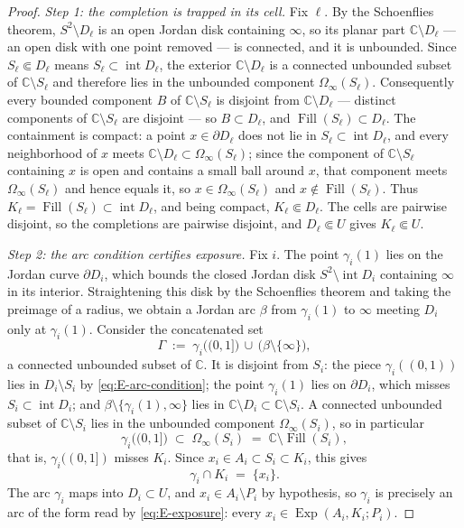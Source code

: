 \documentclass[11pt,reqno]{amsart}
\theoremstyle{definition}
\theoremstyle{remark}
\newcommand{\C}{\mathbb C}
\newcommand{\Fill}{\operatorname{Fill}}
\newcommand{\Exp}{\operatorname{Exp}}
\newcommand{\Int}{\operatorname{int}}
\begin{document}
\begin{proof}
\emph{Step 1: the completion is trapped in its cell.}
Fix $\ell$. By the Schoenflies theorem, $S^2\setminus D_\ell$ is an open Jordan disk
containing $\infty$, so its planar part $\C\setminus D_\ell$ --- an open disk with
one point removed --- is connected, and it is unbounded. Since
$S_\ell\Subset D_\ell$ means $S_\ell\subset\Int D_\ell$, the exterior
$\C\setminus D_\ell$ is a connected unbounded subset of $\C\setminus S_\ell$ and
therefore lies in the unbounded component $\Omega_\infty(S_\ell)$. Consequently
every bounded component $B$ of $\C\setminus S_\ell$ is disjoint from
$\C\setminus D_\ell$ --- distinct components of $\C\setminus S_\ell$ are disjoint
--- so $B\subset D_\ell$, and $\Fill(S_\ell)\subset D_\ell$. The containment is
compact: a point $x\in\partial D_\ell$ does not lie in $S_\ell\subset\Int D_\ell$,
and every neighborhood of $x$ meets $\C\setminus D_\ell\subset
\Omega_\infty(S_\ell)$; since the component of $\C\setminus S_\ell$ containing $x$
is open and contains a small ball around $x$, that component meets
$\Omega_\infty(S_\ell)$ and hence equals it, so $x\in\Omega_\infty(S_\ell)$ and
$x\notin\Fill(S_\ell)$. Thus $K_\ell=\Fill(S_\ell)\subset\Int D_\ell$, and being
compact, $K_\ell\Subset D_\ell$. The cells are pairwise disjoint, so the completions
are pairwise disjoint, and $D_\ell\Subset U$ gives $K_\ell\Subset U$.

\emph{Step 2: the arc condition certifies exposure.}
Fix $i$. The point $\gamma_i(1)$ lies on the Jordan curve $\partial D_i$, which
bounds the closed Jordan disk $S^2\setminus\Int D_i$ containing $\infty$ in its
interior. Straightening this disk by the Schoenflies theorem \cite{New51} and taking
the preimage of a radius, we obtain a Jordan arc $\beta$ from $\gamma_i(1)$ to
$\infty$ meeting $D_i$ only at $\gamma_i(1)$. Consider the concatenated set
\[
\Gamma\;:=\;\gamma_i\bigl((0,1]\bigr)\,\cup\,\bigl(\beta\setminus\{\infty\}\bigr),
\]
a connected unbounded subset of $\C$. It is disjoint from $S_i$: the piece
$\gamma_i((0,1))$ lies in $D_i\setminus S_i$ by \eqref{eq:E-arc-condition}; the
point $\gamma_i(1)$ lies on $\partial D_i$, which misses $S_i\subset\Int D_i$; and
$\beta\setminus\{\gamma_i(1),\infty\}$ lies in $\C\setminus D_i\subset
\C\setminus S_i$. A connected unbounded subset of $\C\setminus S_i$ lies in the
unbounded component $\Omega_\infty(S_i)$, so in particular
\[
\gamma_i\bigl((0,1]\bigr)\;\subset\;\Omega_\infty(S_i)
\;=\;\C\setminus\Fill(S_i),
\]
that is, $\gamma_i((0,1])$ misses $K_i$. Since $x_i\in A_i\subset S_i\subset K_i$,
this gives
\[
\gamma_i\cap K_i\;=\;\{x_i\} .
\]
The arc $\gamma_i$ maps into $D_i\subset U$, and $x_i\in A_i\setminus P_i$ by
hypothesis, so $\gamma_i$ is precisely an arc of the form read by
\eqref{eq:E-exposure}: every $x_i\in\Exp(A_i,K_i;P_i)$.


\end{proof}
\end{document}
